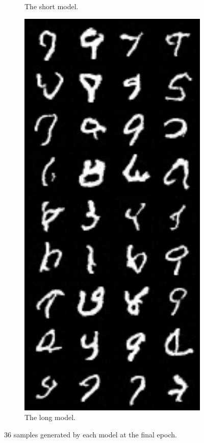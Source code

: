 \begin{figure}
\begin{subfigure}{0.3\textwidth}
    \caption{The short model.}
    \label{fig:q1b_samples_short_final}
\end{subfigure}
\hfill
\begin{subfigure}{0.3\textwidth}
    \centering
    \includegraphics[width=1\textwidth]{./figures/q1b_samples_long_final}
    \caption{The long model.}
    \label{fig:q1b_samples_long_final}
\end{subfigure}
\caption{36 samples generated by each model at the final epoch.}
\label{fig:q1b_samples_final}
\end{figure}

